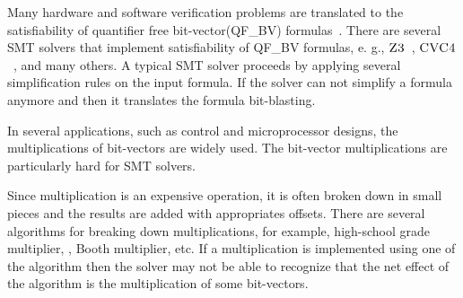 %
Many hardware and software verification problems are translated to the
satisfiability of quantifier free bit-vector(QF\_BV)
formulas~\cite{hardware,cbmc,more}.
%
There are several SMT solvers that implement satisfiability of 
QF\_BV formulas, e. g., $\textsc{Z3}$~\cite{z3}, $\textsc{CVC4}$~\cite{cvc4}, 
and many others.
%
A typical SMT solver proceeds by applying several simplification rules
on the input formula.
%
If the solver can not simplify a formula anymore and then it
translates the formula bit-blasting.

%
In several applications, such as control and microprocessor designs,
the multiplications of bit-vectors are widely used.
%
The bit-vector multiplications are particularly hard for SMT solvers.
%

%
Since multiplication is an expensive operation, it is often broken down
in small pieces and the results are added with appropriates offsets.
%
There are several algorithms for breaking down multiplications, for
example, high-school grade multiplier, , Booth
multiplier, etc.
%
If a multiplication is implemented using one of the algorithm then the
solver may not be able to recognize that the net effect of the
algorithm is the multiplication of some bit-vectors.
%
 













